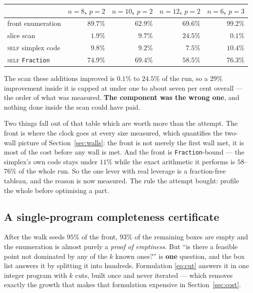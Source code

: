 \documentclass[11pt,a4paper]{article}
\begin{document}
\begin{center}
\begin{tabular}{lrrrr}
\toprule
 & $n{=}8$, $p{=}2$ & $n{=}10$, $p{=}2$ & $n{=}12$, $p{=}2$ & $n{=}6$, $p{=}3$ \\
\midrule
front enumeration               & $\mathbf{89.7\%}$ & $\mathbf{62.9\%}$ & $\mathbf{69.6\%}$ & $\mathbf{99.2\%}$ \\
slice scan                      & $1.9\%$ & $9.7\%$ & $24.5\%$ & $0.1\%$ \\
\midrule
\textsc{self} simplex code      & $9.8\%$ & $9.2\%$ & $7.5\%$ & $10.4\%$ \\
\textsc{self} \texttt{Fraction} & $74.9\%$ & $69.4\%$ & $58.5\%$ & $76.3\%$ \\
\bottomrule
\end{tabular}
\end{center}

\noindent
The scan these additions improved is $0.1\%$ to $24.5\%$ of the run, so a
$29\%$ improvement inside it is capped at under one to about seven per cent
overall --- the order of what was measured.  \textbf{The component was the
wrong one}, and nothing done inside the scan could have paid.

Two things fall out of that table which are worth more than the attempt.  The
front is where the clock goes at every size measured, which quantifies the
two-wall picture of Section~\ref{sec:walls}: the front is not merely the first
wall met, it is most of the cost before any wall is met.  And the front is
\texttt{Fraction}-bound --- the simplex's own code stays under $11\%$ while the
exact arithmetic it performs is $58$--$76\%$ of the whole run.  So the one lever
with real leverage is a fraction-free tableau, and the reason is now measured.
The rule the attempt bought: profile the whole before optimising a part.

\subsection{A single-program completeness certificate}
\label{sec:certificate}

After the walk seeds $95\%$ of the front, $93\%$ of the remaining boxes are
empty and the enumeration is almost purely a \emph{proof of emptiness}.  But
``is there a feasible point not dominated by any of the $k$ known ones?'' is
\textbf{one} question, and the box list answers it by splitting it into
hundreds.  Formulation \eqref{eq:cut} answers it in one integer program with
$k$ cuts, built once and never iterated --- which removes exactly the growth
that makes that formulation expensive in Section~\ref{sec:cost}.
\end{document}
